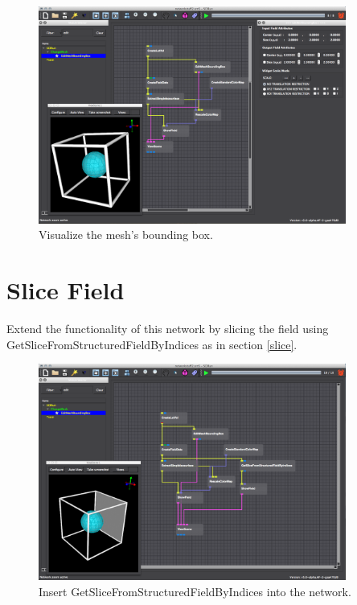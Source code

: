 \documentclass[fleqn,11pt,openany]{book}
\begin{document}
\begin{figure}[H]
\center
\includegraphics[width=0.9\textwidth]{BasicTutorial_figures/bbox.png}
\caption{Visualize the mesh's bounding box.}
\label{fig:changeisoval2}
\end{figure}


\section{Slice Field}\label{slice2}

Extend the functionality of this network by slicing the field using GetSliceFromStructuredFieldByIndices as in section \ref{slice}.

\begin{figure}[H]
\center
\includegraphics[width=0.9\textwidth]{BasicTutorial_figures/getslice2.png}
\caption{Insert GetSliceFromStructuredFieldByIndices into the network.}
\label{fig:slicemod2}
\end{figure}
\end{document}
